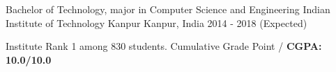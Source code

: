 


\begin{cventries}


\cventry
{Bachelor of Technology, major in Computer Science and Engineering} %
{Indian Institute of Technology Kanpur} %
{Kanpur, India} %
{2014 - 2018 (Expected)} %
{ %
\begin{cvitems}
\item {Institute Rank 1 among 830 students. Cumulative Grade Point /
    \textbf{CGPA: 10.0/10.0}}
\end{cvitems}
}

\end{cventries}

